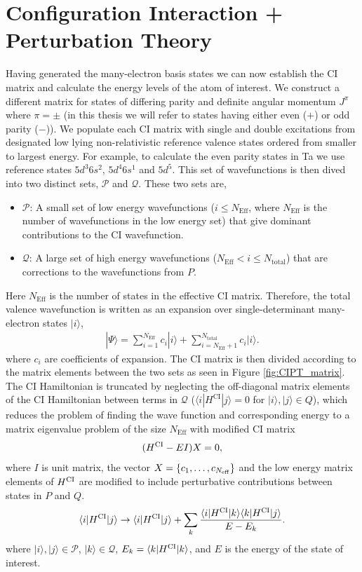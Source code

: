 \documentclass[10pt,a4paper, twoside]{report}
\begin{document}
\section{Configuration Interaction + Perturbation Theory}
Having generated the many-electron basis states we can now establish the CI matrix and calculate the energy levels of the atom of interest. We construct a different matrix for states of differing parity and definite angular momentum $J^{\pi}$ where $\pi = \pm$ (in this thesis we will refer to states having either even ($+$) or odd parity ($-$)). We populate each CI matrix with single and double excitations from designated low lying non-relativistic reference valence states ordered from smaller to largest energy. For example, to calculate the even parity states in Ta we use reference states $5d^3 6s^2$, $5d^4 6s^1$ and $5d^5$. This set of wavefunctions is then dived into two distinct sets, $\mathcal{P}$ and $\mathcal{Q}$. These two sets are,
\begin{itemize}
\item $\mathcal{P}$: A small set of low energy wavefunctions ($i \leq N_{\text{Eff}}$, where $N_{\text{Eff}}$ is the number of wavefunctions in the low energy set) that give dominant contributions to the CI wavefunction.
\item $\mathcal{Q}$: A large set of high energy wavefunctions ($N_{\text{Eff}}<i \leq N_{\text{total}}$) that are corrections to the wavefunctions from $P$.
\end{itemize}
Here $N_{\text{Eff}}$ is the number of states in the effective CI matrix. Therefore, the total valence wavefunction is written as an expansion over single-determinant many-electron states $|i \rangle $,
\begin{align*}\label{eq:psi}
| \Psi \rangle = 
\sum_{i=1}^{N_{\text{Eff}}} c_{i}|i\rangle + \sum_{i = N_{\text{Eff}} + 1}^{N_{\text{total}}} c_{i}|i\rangle .
\end{align*}
where $c_i$ are coefficients of expansion. The CI matrix is then divided according to the matrix elements between the two sets as seen in Figure \ref{fig:CIPT_matrix}.  The CI Hamiltonian is truncated by neglecting the off-diagonal matrix elements of the CI Hamiltonian between terms in $\mathcal{Q}$ ($\langle i | H^{\text{CI}} | j \rangle = 0 $ for $|i\rangle, |j\rangle \in Q$),  which reduces the problem of finding the wave function and corresponding energy to a matrix eigenvalue problem of the size $N_{\text{Eff}}$ with modified CI matrix
\begin{equation} \label{eq:CI}
(H^{\rm CI} - EI)X=0,
\end{equation}
where $I$ is unit matrix, the vector $X = \{c_1, \dots, c_{N_{\rm eff}}\}$ and the low energy matrix elements of $H^{\rm CI}$ are modified to include perturbative contributions between states in $P$ and $Q$.
\begin{equation}
\langle i|H^{\rm CI}|j\rangle \rightarrow \langle i|H^{\rm CI}|j\rangle + 
\sum_k \frac{\langle i|H^{\rm CI}|k\rangle\langle k|H^{\rm
    CI}|j\rangle}{E - E_k}. 
    \label{eq:HCI}
\end{equation}
where $|i\rangle, |j\rangle \in \mathcal{P}$, $|k\rangle \in \mathcal{Q}$,  $E_k = \langle k|H^{\rm CI}|k\rangle$, and $E$ is the energy of the state of interest.  
\end{document}
